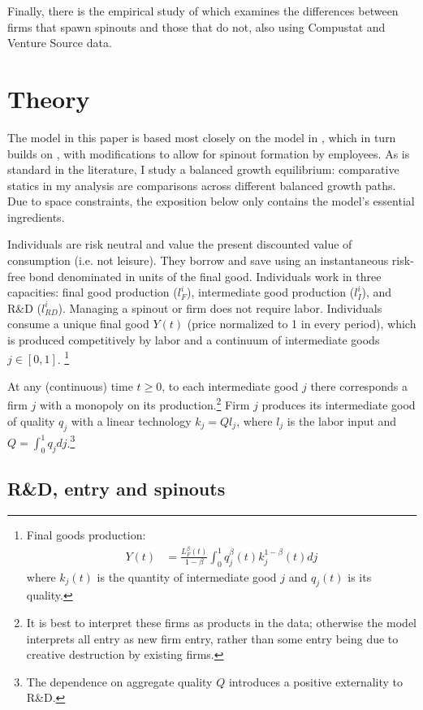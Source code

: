 \documentclass[11pt,english]{article}
\theoremstyle{remark}
\begin{document}
Finally, there is the empirical study of \cite{gompers_entrepreneurial_2005} which examines the differences between firms that spawn spinouts and those that do not, also using Compustat and Venture Source data. 

\section{Theory}

The model in this paper is based most closely on the model in \cite{akcigit_growth_2018}, which in turn builds on \cite{grossman_quality_1991}, with modifications to allow for spinout formation by employees. As is standard in the literature, I study a balanced growth equilibrium: comparative statics in my analysis are comparisons across different balanced growth paths. Due to space constraints, the exposition below only contains the model's essential ingredients.

Individuals are risk neutral and value the present discounted value of consumption (i.e. not leisure). They borrow and save using an instantaneous risk-free bond denominated in units of the final good. Individuals work in three capacities: final good production ($l_F^i$), intermediate good production ($l_I^i$), and R\&D ($l_{RD}^i$). Managing a spinout or firm does not require labor. Individuals consume a unique final good $Y(t)$ (price normalized to 1 in every period), which is produced competitively by labor and a continuum of intermediate goods $j \in [0,1]$. \footnote{Final goods production:
\begin{align*}
Y(t) &= \frac{L_F^{\beta}(t)}{1-\beta} \int_0^1 q_j^{\beta}(t) k_j^{1-\beta} (t) dj
\end{align*}
where $k_j(t)$ is the quantity of intermediate good $j$ and $q_j(t)$ is its quality.
}

At any (continuous) time $t \ge 0$, to each intermediate good $j$ there corresponds a firm $j$ with a monopoly on its production.\footnote{It is best to interpret these firms as products in the data; otherwise the model interprets all entry as new firm entry, rather than some entry being due to creative destruction by existing firms.} Firm $j$ produces its intermediate good of quality $q_j$ with a linear technology $k_j = Q l_j$, where $l_j$ is the labor input and $Q = \int_0^1 q_j dj$.\footnote{The dependence on aggregate quality $Q$ introduces a positive externality to R\&D.}

\subsection{R\&D, entry and spinouts}
\end{document}
